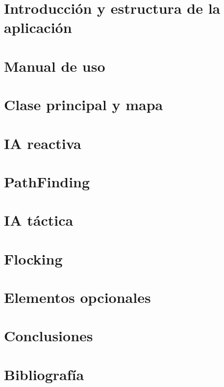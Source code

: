 \documentclass[a4paper,10pt]{article}
\begin{document}
\newpage
\part{Introducción y estructura de la aplicación}





\newpage
\part{Manual de uso}



\newpage
\part{Clase principal y mapa}





\newpage
\part{IA reactiva}









\newpage
\part{PathFinding}



\newpage
\part{IA táctica}

















\newpage
\part{Flocking}




\newpage
\part{Elementos opcionales}




\newpage
\part{Conclusiones}



\newpage
\part{Bibliografía}

\end{document}
